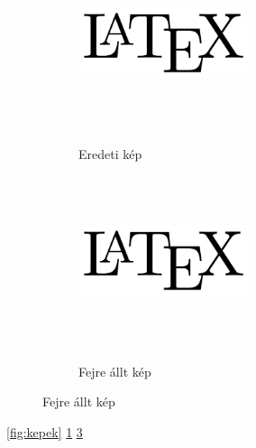 \documentclass{article}
\begin{document}
\listoffigures

\hulipsum[3]
\begin{figure}

\caption{Latex}
\label{fig:kepek}
\begin{subfigure}[c]{5cm}
\caption{Eredeti kép}
\includegraphics[height=5cm, width=5cm, keepaspectratio]{Latex}
\label{fig:eredeti}
\end{subfigure}

\begin{subfigure}[c]{5cm}
\caption{Fejre állt kép}
\includegraphics[angle=180, origin=c, height=5cm, width=5cm, keepaspectratio]{Latex}
\label{fig:fejenallo}
\end{subfigure}

\end{figure}
\hulipsum

\ref{fig:kepek}
\ref{fig:eredeti}
\ref{fig:fejenallo}


\end{document}
